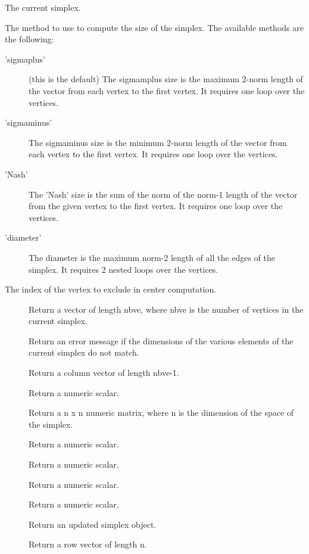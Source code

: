 %
\begin{Arguments}
\begin{ldescription}
\item[\code{this}] The current simplex.
\item[\code{method}] The method to use to compute the size of the simplex. The
available methods are the following: \begin{description}

\item['sigmaplus'] (this is the default) The sigmamplus size is the
maximum 2-norm length of the vector from each vertex to the first
vertex. It requires one loop over the vertices.
\item['sigmaminus'] The sigmaminus size is the minimum 2-norm length of
the vector from each vertex to the first vertex. It requires one loop
over the vertices.
\item['Nash'] The 'Nash' size is the sum of the norm of the norm-1 length
of the vector from the given vertex to the first vertex. It requires one
loop over the vertices.
\item['diameter'] The diameter is the maximum norm-2 length of all the
edges of the simplex. It requires 2 nested loops over the vertices.

\end{description}


\item[\code{iexcl}] The index of the vertex to exclude in center computation.
\end{ldescription}
\end{Arguments}
%
\begin{Value}
\begin{description}

\item[] Return a vector of length nbve, where nbve
is the number of vertices in the current simplex.
\item[] Return an error message if the dimensions
of the various elements of the current simplex do not match.
\item[] Return a column vector of length nbve-1.
\item[] Return a numeric scalar.
\item[] Return a n x n numeric matrix, where n is
the dimension of the space of the simplex.
\item[] Return a numeric scalar.
\item[] Return a numeric scalar.
\item[] Return a numeric scalar.
\item[] Return a numeric scalar.
\item[] Return an updated simplex object.
\item[] Return a row vector of length n.

\end{description}

\end{Value}
